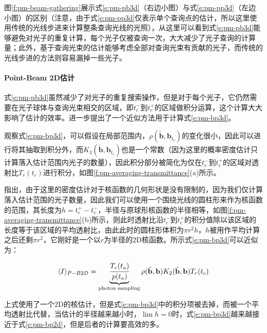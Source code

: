 图\ref{f:pm-beam-gathering}展示式\ref{e:pm-pb3d}（右边小图）与式\ref{e:pm-pp3d}（左边小图）的区别（注意，由于式\ref{e:pm-pp3d}仅表示单个查询点的估计，所以这里使用传统的光线步进来计算整条查询光线的光照），从这里可以看到式\ref{e:pm-pb3d}能够避免对光子的重复计算，每个光子仅被查询一次，大大减少了光子查询的计算量；此外，基于查询光束的估计能够考虑全部对查询光束有贡献的光子，而传统的光线步进的方法则容易漏掉一些光子。



\paragraph{Point-Beam 2D估计}
式\ref{e:pm-pb3d}虽然减少了对光子的重复搜索操作，但是对于每个光子，它仍然需要在光子球体与查询光束相交的区域，即$t^{-}_{c}$到$t^{+}_{c}$的区域做积分运算，这个计算大大影响了估计的效率。\cite{a:TheBeamRadianceEstimateforVolumetricPhotonMapping}进一步提出了一个近似方法用于计算式\ref{e:pm-bp3d}。

观察式\ref{e:pm-bp3d}，可以假设在局部范围内，$\rho(\tilde{\mathbf{b}},\mathbf{b}_{t_c})$的变化很小，因此可以进行将其抽取到积分外，而$K_3(\tilde{\mathbf{b}},\mathbf{b}_{t_c})$也是一个常数（因为这里的概率密度估计只计算落入估计范围内光子的数量），因此积分部分被简化为仅在$t^{-}_{c}$到$t^{+}_{c}$的区域对透射比$T_r(t_c)$进行积分，如图\ref{f:pm-averaging-transmittance}(a)所示。

\cite{a:AComprehensiveTheoryofVolumetricRadianceEstimationusingPhotonPointsandBeams}指出，由于这里的密度估计对于核函数的几何形状是没有限制的，因为我们仅计算落入估计范围的光子数量，因此我们可以使用一个围绕光线的圆柱形来作为核函数的范围，其长度为$h=t^{+}_c-t^{-}_c$，半径与原球形核函数的半径相等，如图\ref{f:pm-averaging-transmittance}(b)所示，则此时透射比沿$t^{-}_{c}$到$t^{+}_{c}$的积分值除以该区域的长度等于该区域的平均透射比，由此此时的圆柱形体积为$\pi r^{2}h$，$h$被用作平均计算之后还剩$\pi r^{2}$，它刚好是一个以$r$为半径的2D核函数。所示式\ref{e:pm-bp3d}可以近似为：

\begin{equation}\label{e:pm-pb2d}
	\langle I\rangle_{P-B2D}=\underbrace{ \cfrac{T_r(t_a)}{p(t_a)}}_{\text{photon sampling}}\rho(\tilde{\mathbf{b}},\mathbf{b})K_2(\tilde{\mathbf{b}},\mathbf{b})T_r(t_c)
\end{equation}

上式使用了一个2D的核估计，但是式\ref{e:pm-bp3d}中的积分项被去掉，而被一个平均透射比代替，当估计的半径越来越小时，$\lim{h}=0$时，式\ref{e:pm-bp3d}越来越接近于式\ref{e:pm-bp2d}，但是后者的计算要高效的多。


